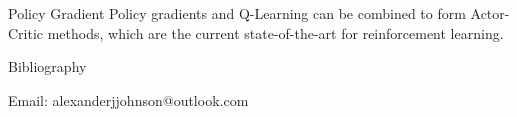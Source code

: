 \documentclass[final]{beamer}
\begin{document}
\begin{frame}[t]
\begin{columns}
\begin{column}[t]{0.3\textwidth}
\begin{block}{Policy Gradient}
        Policy gradients and Q-Learning can be combined to form Actor-Critic
        methods, which are the current state-of-the-art for reinforcement
        learning.
    \end{block}
    \vspace{1cm}

    \begin{block}{Bibliography}
        \renewcommand*{\bibfont}{\normalfont\scriptsize}
        \linespread{1}
        \printbibliography
    \end{block}
    \vspace{2cm}
    Email: alexanderjjohnson@outlook.com
\end{column}
\end{columns}
\end{frame}
\end{document}
